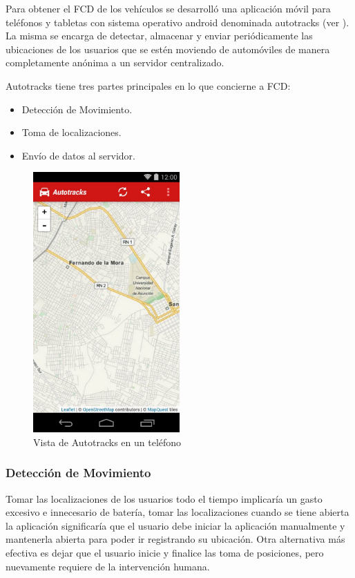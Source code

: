 Para obtener el FCD de los vehículos se desarrolló una aplicación móvil para teléfonos y tabletas con sistema operativo android denominada autotracks (ver ). La misma se encarga de detectar, almacenar y enviar periódicamente las ubicaciones de los usuarios que se estén moviendo de automóviles de manera completamente anónima a un servidor centralizado.

Autotracks tiene tres partes principales en lo que concierne a FCD: 
\begin{itemize}
	\item Detección de Movimiento.
	\item Toma de localizaciones.
	\item Envío de datos al servidor.
\end{itemize}

\begin{figure}[h]
	\centering
	\includegraphics[width=0.5\textwidth]{capitulos/6/figuras/figura2.jpg}
	\caption{\label{fig:autotracks} Vista de Autotracks en un teléfono}	
\end{figure}

\subsubsection{Detección de Movimiento}

Tomar las localizaciones de los usuarios todo el tiempo implicaría un gasto excesivo e innecesario de batería, tomar las localizaciones cuando se tiene abierta la aplicación significaría que el usuario debe iniciar la aplicación manualmente y mantenerla abierta para poder ir registrando su ubicación. Otra alternativa más efectiva es dejar que el usuario inicie y finalice las toma de posiciones, pero nuevamente requiere de la intervención humana.

